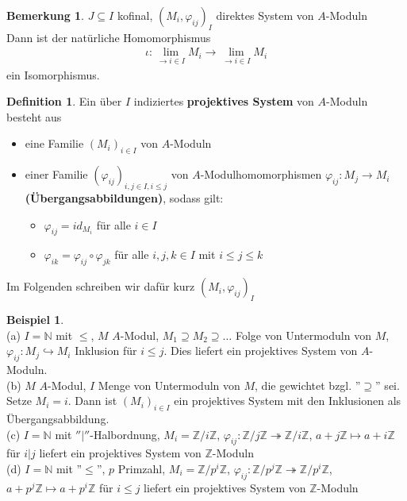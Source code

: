 \documentclass[10pt,a4paper,numbers=endperiod]{scrreprt}
\theoremstyle{definition}
\newtheorem{defi}[satz]{Definition}
\newtheorem{bem}[satz]{Bemerkung}
\newtheorem{bsp}[satz]{Beispiel}
\def\NN{{\mathbb N}}
\def\ZZ{{\mathbb Z}}
\begin{document}
\begin{bem}
	$J \subseteq I$ kofinal, $(M_i, \varphi_{ij})_I$ direktes System von $A$-Moduln\\
	Dann ist der natürliche Homomorphismus \begin{align*}
		\iota: \lim\limits_{\to i \in I} M_i \longrightarrow \lim\limits_{\to i \in I} M_i
	\end{align*}
	ein Isomorphismus.
\end{bem}

\begin{defi}
	Ein über $I$ indiziertes \textbf{projektives System} von $A$-Moduln besteht aus \begin{itemize}
		\item eine Familie $(M_i)_{i \in I}$ von $A$-Moduln
		\item einer Familie $(\varphi_{ij})_{i,j \in I, i \leq j}$ von $A$-Modulhomomorphismen $\varphi_{ij}: M_j \to M_i$ \textbf{(Übergangsabbildungen)}, sodass gilt: \begin{itemize}
			\item $\varphi_{ij} = id_{M_i}$ für alle $i \in I$
			\item $\varphi_{ik} = \varphi_{ij} \circ \varphi_{jk}$ für alle $i,j,k \in I$ mit $i \leq j \leq k$
		\end{itemize}
	\end{itemize}
	Im Folgenden schreiben wir dafür kurz $(M_i, \varphi_{ij})_I$
\end{defi}

\begin{bsp}
	$ $\\
	(a) $I = \NN$ mit $\leq$, $M$ $A$-Modul, $M_1 \supseteq M_2 \supseteq \ldots$ Folge von Untermoduln von $M$, $\varphi_{ij}: M_j \hookrightarrow M_i$ Inklusion für $i \leq j$. Dies liefert ein projektives System von $A$-Moduln.\\
	(b) $M$ $A$-Modul, $I$ Menge von Untermoduln von $M$, die gewichtet bzgl. ''$\supseteq$'' sei.\\
	Setze $M_i = i$. Dann ist $(M_i)_{i \in I}$ ein projektives System mit den Inklusionen als Übergangsabbildung.\\
	(c) $I = \NN$ mit $''|''$-Halbordnung, $M_i = \ZZ/i \ZZ$, $\varphi_{ij}: \ZZ/j \ZZ \twoheadrightarrow \ZZ/i \ZZ$, $a + j\ZZ \mapsto a + i \ZZ$ für $i|j$ liefert ein projektives System von $\ZZ$-Moduln\\
	(d) $I = \NN$ mit ''$\leq$'', $p$ Primzahl, $M_i = \ZZ/p^i \ZZ$, $\varphi_{ij}: \ZZ/p^j \ZZ \twoheadrightarrow \ZZ/p^i \ZZ$, $a + p^j\ZZ \mapsto
	 a + p^i \ZZ$ für $i \leq j$ liefert ein projektives System von $\ZZ$-Moduln
\end{bsp}
\end{document}

